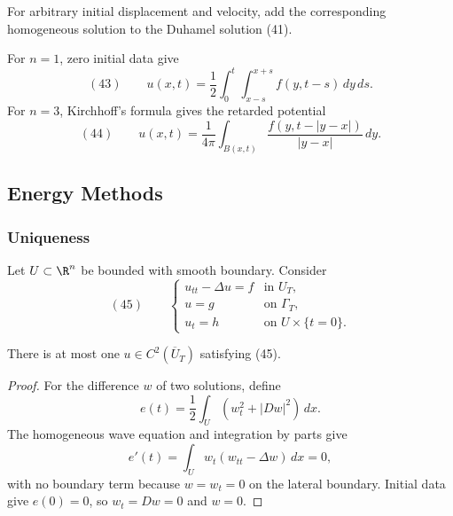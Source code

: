 \begin{remark}
\label{rem:wave-equation-general-nonhomogeneous-solution}
For arbitrary initial displacement and velocity, add the corresponding
homogeneous solution to the Duhamel solution (41).
\end{remark}

\begin{example}[Nonhomogeneous wave equation for $n=1,3$]
\label{ex:wave-equation-nonhomogeneous-n1-n3}
For $n=1$, zero initial data give
$$(43)\qquad
u(x,t)=\frac12\int_0^t\int_{x-s}^{x+s}f(y,t-s)\,dy\,ds.$$
For $n=3$, Kirchhoff's formula gives the retarded potential
$$(44)\qquad
u(x,t)=\frac1{4\pi}\int_{B(x,t)}
\frac{f(y,t-|y-x|)}{|y-x|}\,dy.$$
\end{example}

\subsection{Energy Methods}
\label{sec:wave-energy-methods}

\subsubsection{Uniqueness}
\label{sec:wave-energy-uniqueness}

Let $U\subset\R^n$ be bounded with smooth boundary. Consider
$$(45)\qquad
\begin{cases}
u_{tt}-\Delta u=f&\text{in }U_T,\\
u=g&\text{on }\Gamma_T,\\
u_t=h&\text{on }U\times\{t=0\}.
\end{cases}$$

\begin{theorem}
\label{thm:uniqueness-wave-equation-energy-method}
There is at most one $u\in C^2(\overline U_T)$ satisfying (45).
\end{theorem}
\begin{proof}
\sketch For the difference $w$ of two solutions, define
$$e(t)=\frac12\int_U(w_t^2+|Dw|^2)\,dx.$$
The homogeneous wave equation and integration by parts give
$$e'(t)=\int_Uw_t(w_{tt}-\Delta w)\,dx=0,$$
with no boundary term because $w=w_t=0$ on the lateral boundary. Initial data
give $e(0)=0$, so $w_t=Dw=0$ and $w=0$.
\end{proof}

